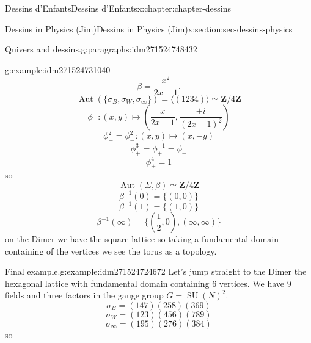 \documentclass[oneside,10pt,]{book}
\numberwithin{equation}{section}
\newcommand{\inv}{^{-1}}
\newcommand{\ZZ}{\mathbf{Z}}
\DeclareMathOperator{\Aut}{Aut}
\DeclareMathOperator{\specialunitary}{SU}
\begin{document}
\begin{chapterptx}{Dessins d'Enfants}{}{Dessins d'Enfants}{}{}{x:chapter:chapter-dessins}
\begin{sectionptx}{Dessins in Physics (Jim)}{}{Dessins in Physics (Jim)}{}{}{x:section:sec-dessins-physics}
\begin{paragraphs}{Quivers and dessins.}{g:paragraphs:idm271524748432}
\begin{example}{}{g:example:idm271524731040}
\begin{equation*}
\end{equation*}
%
\begin{equation*}
\beta = \frac{x^2}{2x-1}\text{.}
\end{equation*}
%
\begin{equation*}
\Aut(\{\sigma_B,\sigma_W, \sigma_\infty\}) = \langle (1234) \rangle \simeq \ZZ/4\ZZ
\end{equation*}
%
\begin{equation*}
\phi_\pm \colon (x,y) \mapsto \left(\frac{x}{2x -1},\frac{\pm i}{(2x-1)^2} \right)
\end{equation*}
%
\begin{equation*}
\phi_+^2 = \phi_-^2 \colon (x,y) \mapsto (x,-y)
\end{equation*}
%
\begin{equation*}
\phi_+^3 = \phi_+\inv = \phi_-
\end{equation*}
%
\begin{equation*}
\phi_+^4 = 1
\end{equation*}
so%
\begin{equation*}
\Aut(\Sigma, \beta) \simeq \ZZ/4\ZZ
\end{equation*}
%
\begin{equation*}
\beta\inv(0)= \{(0,0)\}
\end{equation*}
%
\begin{equation*}
\beta\inv(1)= \{(1,0)\}
\end{equation*}
%
\begin{equation*}
\beta\inv(\infty)= \{(\frac 12,0), (\infty,\infty)\}
\end{equation*}
on the Dimer we have the square lattice so taking a fundamental domain containing  of the vertices we see the torus as a topology.%
\end{example}
\begin{example}{Final example.}{g:example:idm271524724672}%
Let's jump straight to the Dimer the hexagonal lattice with fundamental domain containing 6 vertices. We have 9 fields and three factors in the gauge group \(G = \specialunitary (N)^2\).%
\begin{equation*}
\sigma_B = (147)(258)(369)
\end{equation*}
%
\begin{equation*}
\sigma_W = (123)(456)(789)
\end{equation*}
%
\begin{equation*}
\sigma_\infty = (195)(276)(384)
\end{equation*}
so%
\begin{equation*}

\end{equation*}
\end{example}
\end{paragraphs}
\end{sectionptx}
\end{chapterptx}
\end{document}
